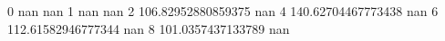 0 nan nan
1 nan nan
2 106.82952880859375 nan
4 140.62704467773438 nan
6 112.61582946777344 nan
8 101.0357437133789 nan
